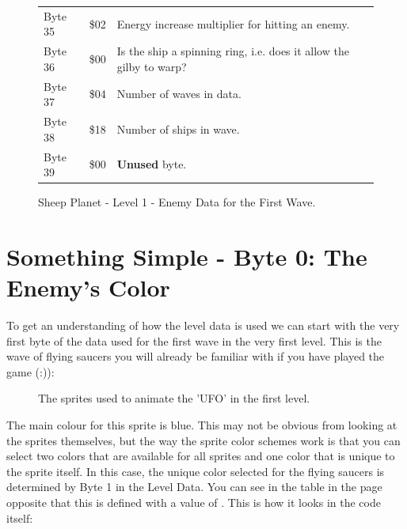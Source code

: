 \begin{figure}[H]
{\begin{adjustbox}{width=13cm}
\begin{tabular}{lll}
 Byte 35 & \$02                       & Energy increase multiplier for hitting an enemy.\\
 Byte 36 & \$00                       & Is the ship a spinning ring, i.e. does it allow the gilby to warp? \\
 Byte 37 & \$04                       & Number of waves in data.                                           \\
 Byte 38 & \$18                       & Number of ships in wave.                                           \\
 Byte 39 & \$00                       & \textbf{Unused} byte.                                                      \\
\bottomrule
\end{tabular}

  \end{adjustbox}

  }\caption*{Sheep Planet - Level 1 - Enemy Data for the First Wave.}
\end{figure}
\clearpage

\section{Something Simple - Byte 0: The Enemy's Color}
To get an understanding of how the level data is used we can start with the very first byte of the data
used for the first wave in the very first level. This is the wave of flying saucers you will already be
familiar with if you have played the game (:)):
\begin{figure}[H]
  {
    \setlength{\tabcolsep}{3.0pt}
    \setlength\cmidrulewidth{\heavyrulewidth} %
	\centering
	\def\MULTICOLORONE{white}
	\def\MULTICOLORTWO{red}
	\def\SPRITECOLOR{blue}
	\begin{subfigure}{0.3\textwidth}
		
	\end{subfigure}
	\begin{subfigure}{0.3\textwidth}
		
	\end{subfigure}
	\begin{subfigure}{0.3\textwidth}
		
	\end{subfigure}
  }\caption[position=top]{The sprites used to animate the 'UFO' in the first level.}
\end{figure}

The main colour for this sprite is blue. This may not be obvious from looking at the sprites themselves, but
the way the sprite color schemes work is that you can select two colors that are available for all sprites and
one color that is unique to the sprite itself. In this case, the unique color selected for the flying saucers is
determined by Byte 1 in the Level Data. You can see in the table in the page opposite
that this is defined with a value of . This is how it looks in the code itself:

